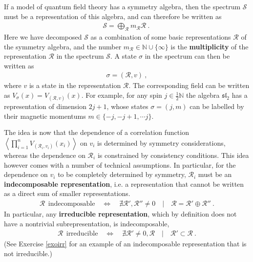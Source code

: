\documentclass[12pt, a4paper, notitlepage, twoside]{report}
\numberwithin{equation}{section}
\theoremstyle{break}
\begin{document}
If a model of quantum field theory has a symmetry algebra, then the spectrum $\mathcal{S}$ must be a representation of this algebra, and can therefore be written as
\begin{align}
 \mathcal{S} = \bigoplus_\mathcal{R} m_\mathcal{R}  \mathcal{R}\ .\
\label{somr}
\end{align}
Here we have decomposed $\mathcal{S}$ as a combination of some basic representations $\mathcal{R}$ of the symmetry algebra, and the number $m_\mathcal{R} \in {\mathbb{N}}\cup\{\infty\}$ is the \textbf{\boldmath multiplicity} of the representation $\mathcal{R}$ in the spectrum $\mathcal{S}$.
A state $\sigma$ in the spectrum can then be written as 
\begin{align}
 \sigma = (\mathcal{R},v)\ ,
\label{arv}
\end{align}
where $v$ is a state in the representation $\mathcal{R}$. 
The corresponding field can be written as 
$V_\sigma(x)= V_{(\mathcal{R},v)}(x)$. 
For example, for any spin $j\in \frac12 \mathbb{N}$ the algebra $\mathfrak{sl}_2$ has a representation of dimension $2j+1$, whose states $\sigma = (j,m)$ can be labelled by their magnetic momentums $m\in\{-j, -j+1,\cdots j\}$.

The idea is now that the dependence of a correlation function $\left\langle \prod_{i=1}^n V_{(\mathcal{R}_i,v_i)}(x_i)\right\rangle$ on $v_i$ is determined by symmetry considerations, whereas the dependence on $\mathcal{R}_i$ is constrained by consistency conditions.
This idea however comes with a number of technical assumptions.
In particular, for the dependence on $v_i$ to be completely determined by symmetry, $\mathcal{R}_i$ must be an \textbf{\boldmath indecomposable representation}, i.e. a representation that cannot be written as a direct sum of smaller representations.
\begin{align}
 \mathcal{R} \ \ \text{indecomposable} \quad \iff \quad \nexists \mathcal{R}',\mathcal{R}'' \neq 0 \quad | \quad \mathcal{R} = \mathcal{R}'\oplus \mathcal{R}''\ .
\end{align}
In particular, any \textbf{\boldmath irreducible representation}, which by definition does not have a nontrivial subrepresentation, is indecomposable,
\begin{align}
 \mathcal{R} \ \ \text{irreducible} \quad \iff \quad \nexists \mathcal{R}' \neq 0,\mathcal{R} \quad | \quad \mathcal{R}'\subset \mathcal{R}\ .
\end{align}
(See Exercise \ref{exoirr} for an example of an indecomposable representation that is not irreducible.)
\end{document}
